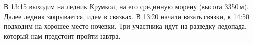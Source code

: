     В 13:15 выходим на ледник Крумкол, на его срединную морену (высота 3350\,м). Далее ледник закрывается, идем в
    связках. В 13:20 начали вязать связки, к 14:50 подходим на хорошее место ночевки. Три участника идут на разведку
    ледопада, который нам предстоит пройти завтра.

    \FloatBarrier
    
    
    
    
    
    
    
    

